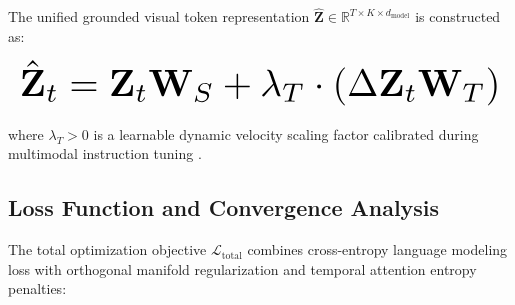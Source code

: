 \documentclass{article}
\begin{document}
The unified grounded visual token representation $\hat{\mathbf{Z}} \in \mathbb{R}^{T \times K \times d_{\text{model}}}$ is constructed as:
























\begin{equation}
\resizebox{\columnwidth}{!}{$\displaystyle
\begin{aligned}
\hat{\mathbf{Z}}_t = \mathbf{Z}_t \mathbf{W}_S + \lambda_T \cdot \left( \Delta \mathbf{Z}_t \mathbf{W}_T \right)
\end{aligned}
$}
\end{equation}
























where $\lambda_T > 0$ is a learnable dynamic velocity scaling factor calibrated during multimodal instruction tuning \cite{arxiv_2305_18290}.




\subsection{Loss Function and Convergence Analysis}


The total optimization objective $\mathcal{L}_{\text{total}}$ combines cross-entropy language modeling loss with orthogonal manifold regularization and temporal attention entropy penalties:
\end{document}
